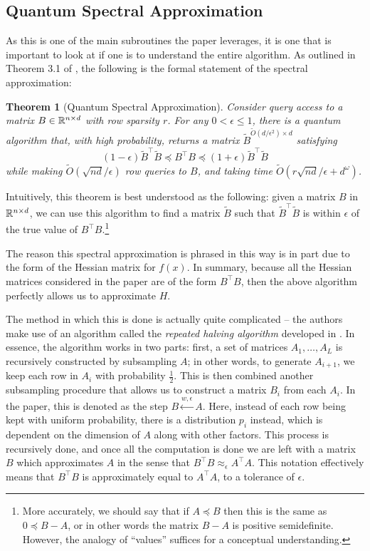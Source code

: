 \documentclass[11pt]{article}
\newtheorem{theorem}{Theorem}
\begin{document}
\subsection{Quantum Spectral Approximation}
\label{Quantum Spectral Approximation}
As this is one of the main subroutines the paper leverages, it is one that is important to look at if one is to 
understand the entire algorithm. As outlined in Theorem 3.1 of \cite{apersQuantumSpeedupsLinear2024}, 
the following is the formal statement of the spectral 
approximation:

\begin{theorem}[Quantum Spectral Approximation]
	Consider query access to a matrix \( B \in \mathbb R^{n \times d} \) with row sparsity \( r \). For any \( 0 < 
	\epsilon \le 1\), there is a quantum algorithm that, with high probability, returns a matrix \( \tilde B^{
	\widetilde O(d / \epsilon^2) \times d} \) satisfying 
	\[
		(1 - \epsilon) \tilde B^{\top} \tilde B \preceq B ^{\top} B \preceq (1 + \epsilon) \tilde B^{\top} \tilde B
	\] 
	while making \( \widetilde O(\sqrt{nd}  / \epsilon) \) row queries to \( B \), and taking time 
	\( \widetilde O(r\sqrt{nd} / \epsilon + d^{\omega}) \).  
\end{theorem}
Intuitively, this theorem is best understood as the following: given a matrix \( B \) in \( \mathbb R^{n \times d} \), 
we can use this algorithm to find a matrix \( \tilde B \) such that \( \tilde B^{\top} \tilde B \) is 
within \( \epsilon \) of the true value of \( B^{\top} B \).\footnote{More accurately, we should say that 
	if \( A \preceq B \) then this is the same as \( 0 \preceq B - A \), or in other words the matrix \( B - A \) is 
positive semidefinite. However, the analogy of ``values'' suffices for a conceptual understanding.}  

The reason this spectral approximation is phrased in this way is in part due to the form of the Hessian matrix 
for \( f(x) \). In summary, because all the Hessian matrices considered in the paper are of the form 
\( B^{\top}B \), then the above algorithm perfectly allows us to approximate \( H \).  

The method in which this is done is actually quite complicated -- the authors make use of an algorithm called 
the \textit{repeated halving algorithm} developed in \cite{cohenEll_pRowSampling2014}. 
In essence, the algorithm works in two parts: first, 
a set of matrices \( A_1, \dots, A_{L} \) is recursively constructed by subsampling \( A \); in other words, 
to generate \( A_{i + 1} \), we keep each row in \( A_i \) with probability \( \frac{1}{2} \). This is then 
combined another subsampling procedure that allows us to construct a matrix \( B_i \) from each \( A_i \). In 
the paper, this is denoted as the step \( B \overset{w, \epsilon}{\leftarrow} A \). Here, instead of each row 
being kept with uniform probability, there is a distribution \( p_i \) instead, which is dependent on the 
dimension of \( A \) along with other factors. This process is recursively done, and once all the 
computation is done we are left with a matrix \( B \) which approximates \( A \) in the sense 
that \( B^{\top}B \approx_\epsilon A^{\top}A \). This notation effectively means that 
\( B^{\top} B \) is approximately equal to \( A^{\top} A \), to a tolerance of 
\( \epsilon \). 
\end{document}
